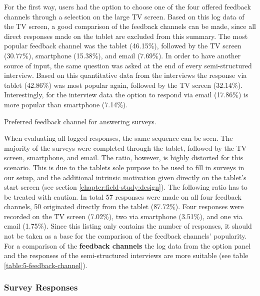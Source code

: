 	For the first way, users had the option to choose one of the four offered feedback channels through a selection on the large TV screen. Based on this log data of the TV screen, a good comparison of the feedback channels can be made, since all direct responses made on the tablet are excluded from this summary. The most popular feedback channel was the tablet (46.15\%), followed by the TV screen (30.77\%), smartphone (15.38\%), and email (7.69\%).
	In order to have another source of input, the same question was asked at the end of every semi-structured interview. Based on this quantitative data from the interviews the response via tablet (42.86\%) was most popular again, followed by the TV screen (32.14\%). Interestingly, for the interview data the option to respond via email (17.86\%) is more popular than smartphone (7.14\%). 
	

	\begin{table}[h]
		\small
		\center
		
		\caption[Feedback Channel]{Preferred feedback channel for answering surveys.}
		\label{table:5-feedback-channel}
	\end{table}


	When evaluating all logged responses, the same sequence can be seen. The majority of the surveys were completed through the tablet, followed by the TV screen, smartphone, and email. The ratio, however, is highly distorted for this scenario. This is due to the tablets sole purpose to be used to fill in surveys in our setup, and the additional intrinsic motivation given directly on the tablet's start screen (see section \ref{chapter:field-study:design}). The following ratio has to be treated with caution. In total 57 responses were made on all four feedback channels, 50 originated directly from the tablet (87.72\%). Four responses were recorded on the TV screen (7.02\%), two via smartphone (3.51\%), and one via email (1.75\%). Since this listing only contains the number of responses, it should not be taken as a base for the comparison of the feedback channels' popularity. %
	For a comparison of the \textbf{feedback channels} the log data from the option panel and the responses of the semi-structured interviews are more suitable (see table \ref{table:5-feedback-channel}).




	\subsubsection{Survey Responses}
	\label{5:results:survey}

